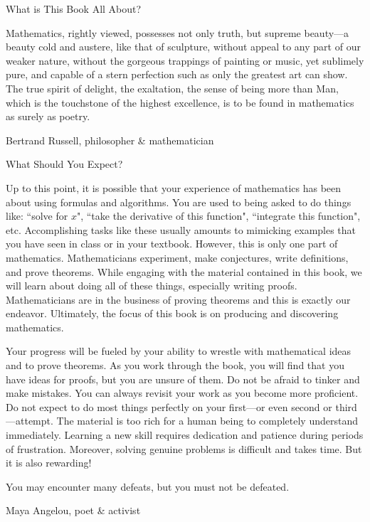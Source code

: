 \begin{section}{What is This Book All About?}
\epigraph{Mathematics, rightly viewed, possesses not only truth, but supreme beauty---a beauty cold and austere, like that of sculpture, without appeal to any part of our weaker nature, without the gorgeous trappings of painting or music, yet sublimely pure, and capable of a stern perfection such as only the greatest art can show. The true spirit of delight, the exaltation, the sense of being more than Man, which is the touchstone of the highest excellence, is to be found in mathematics as surely as poetry.}{Bertrand Russell, philosopher \& mathematician}

\end{section}

\begin{section}{What Should You Expect?}\label{sec:what_should_you_expect}

Up to this point, it is possible that your experience of mathematics has been about using formulas and algorithms. You are used to being asked to do things like: ``solve for $x$", ``take the derivative of this function", ``integrate this function", etc. Accomplishing tasks like these usually amounts to mimicking examples that you have seen in class or in your textbook. However, this is only one part of mathematics.  Mathematicians experiment, make conjectures, write definitions, and prove theorems.  While engaging with the material contained in this book, we will learn about doing all of these things, especially writing proofs. Mathematicians are in the business of proving theorems and this is exactly our endeavor. Ultimately, the focus of this book is on producing and discovering mathematics.

Your progress will be fueled by your ability to wrestle with mathematical ideas and to prove theorems.  As you work through the book, you will find that you have ideas for proofs, but you are unsure of them.  Do not be afraid to tinker and make mistakes.  You can always revisit your work as you become more proficient. Do not expect to do most things perfectly on your first---or even second or third---attempt. The material is too rich for a human being to completely understand immediately. Learning a new skill requires dedication and patience during periods of frustration. Moreover, solving genuine problems is difficult and takes time. But it is also rewarding! 


\epigraph{You may encounter many defeats, but you must not be defeated.}{Maya Angelou, poet \& activist}
	
\end{section}

